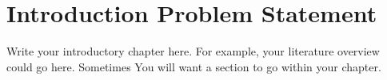 \chapter{Introduction Problem Statement}
\label{ch1}

Write your introductory chapter here. For example, your literature
overview could go here. Sometimes You will want a section to go within your chapter.
